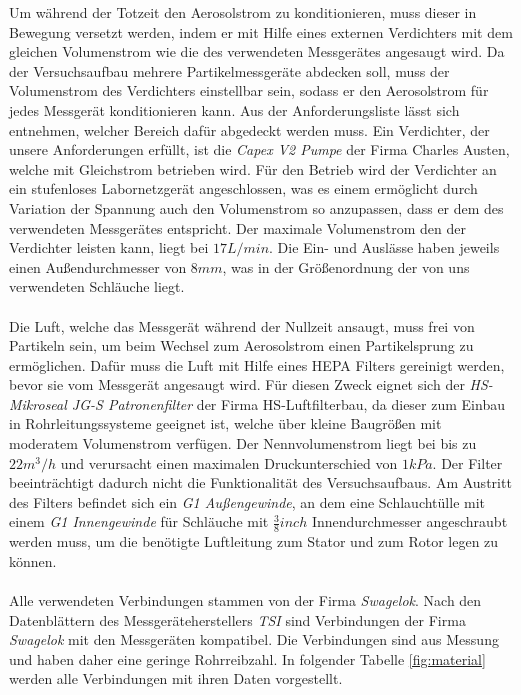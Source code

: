 Um w\"{a}hrend der Totzeit den Aerosolstrom zu konditionieren, muss dieser in Bewegung versetzt werden, indem er mit Hilfe eines externen Verdichters mit dem gleichen Volumenstrom wie die des verwendeten Messger\"{a}tes angesaugt wird. Da der Versuchsaufbau mehrere Partikelmessger\"{a}te abdecken soll, muss der Volumenstrom des Verdichters einstellbar sein, sodass er den Aerosolstrom f\"{u}r jedes Messger\"{a}t konditionieren kann. Aus der Anforderungsliste l\"{a}sst sich entnehmen, welcher Bereich daf\"{u}r abgedeckt werden muss. Ein Verdichter, der unsere Anforderungen erf\"{u}llt, ist die \textit{Capex V2 Pumpe} der Firma Charles Austen, welche mit Gleichstrom betrieben wird. F\"{u}r den Betrieb wird der Verdichter an ein stufenloses Labornetzger\"{a}t angeschlossen, was es einem erm\"{o}glicht durch Variation der Spannung auch den Volumenstrom so anzupassen, dass er dem des verwendeten Messger\"{a}tes entspricht. Der maximale Volumenstrom den der Verdichter leisten kann, liegt bei \(17 L/min\). Die Ein- und Ausl\"{a}sse haben jeweils einen Au{\ss}endurchmesser von \(8mm\), was in der Gr\"{o}{\ss}enordnung der von uns verwendeten Schl\"{a}uche liegt.
\\\\
Die Luft, welche das Messger\"{a}t w\"{a}hrend der Nullzeit ansaugt, muss frei von Partikeln sein, um beim Wechsel zum Aerosolstrom einen Partikelsprung zu erm\"{o}glichen. Daf\"{u}r muss die Luft mit Hilfe eines HEPA Filters gereinigt werden, bevor sie vom Messger\"{a}t angesaugt wird. F\"{u}r diesen Zweck eignet sich der \textit{HS-Mikroseal JG-S Patronenfilter} der Firma HS-Luftfilterbau, da dieser zum Einbau in Rohrleitungssysteme geeignet ist, welche \"{u}ber kleine Baugr\"{o}{\ss}en mit moderatem Volumenstrom verf\"{u}gen. Der Nennvolumenstrom liegt bei bis zu \(22m^3 / h\) und verursacht einen maximalen Druckunterschied von 
\(1 kPa\). Der Filter beeintr\"{a}chtigt dadurch nicht die Funktionalit\"{a}t des Versuchsaufbaus. Am Austritt des Filters befindet sich ein \textit{G1 Au{\ss}engewinde}, an dem eine Schlaucht\"{u}lle mit einem \textit{G1 Innengewinde} f\"{u}r Schl\"{a}uche mit \(\frac{3}{8} inch\) Innendurchmesser angeschraubt werden muss, um die ben\"{o}tigte Luftleitung zum Stator und zum Rotor legen zu k\"{o}nnen.
\\\\
Alle verwendeten Verbindungen stammen von der Firma \textit{Swagelok}. Nach den Datenbl\"{a}ttern des Messger\"{a}teherstellers \textit{TSI} sind Verbindungen der Firma \textit{Swagelok} mit den Messger\"{a}ten kompatibel. Die Verbindungen sind aus Messung und haben daher eine geringe Rohrreibzahl. In folgender Tabelle \ref{fig:material} werden alle Verbindungen mit ihren Daten vorgestellt.
